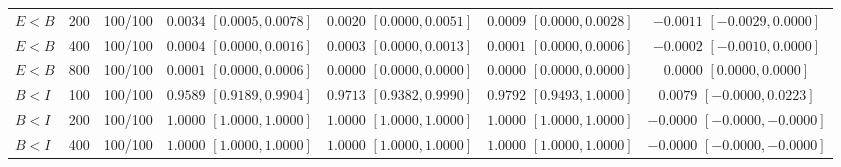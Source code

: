 \documentclass[12pt,letterpaper]{article}
\theoremstyle{plain}
\theoremstyle{definition}
\begin{document}
\begin{table}[p]
\begin{adjustbox}{max width=\linewidth}
\begin{tabular}{lrccccc}
$E<B$ & 200 & 100/100 & \shortstack{$0.0034$\\{\scriptsize$[0.0005,0.0078]$}} & \shortstack{$0.0020$\\{\scriptsize$[0.0000,0.0051]$}} & \shortstack{$0.0009$\\{\scriptsize$[0.0000,0.0028]$}} & \shortstack{$-0.0011$\\{\scriptsize$[-0.0029,0.0000]$}}\\
$E<B$ & 400 & 100/100 & \shortstack{$0.0004$\\{\scriptsize$[0.0000,0.0016]$}} & \shortstack{$0.0003$\\{\scriptsize$[0.0000,0.0013]$}} & \shortstack{$0.0001$\\{\scriptsize$[0.0000,0.0006]$}} & \shortstack{$-0.0002$\\{\scriptsize$[-0.0010,0.0000]$}}\\
$E<B$ & 800 & 100/100 & \shortstack{$0.0001$\\{\scriptsize$[0.0000,0.0006]$}} & \shortstack{$0.0000$\\{\scriptsize$[0.0000,0.0000]$}} & \shortstack{$0.0000$\\{\scriptsize$[0.0000,0.0000]$}} & \shortstack{$0.0000$\\{\scriptsize$[0.0000,0.0000]$}}\\
\addlinespace
$B<I$ & 100 & 100/100 & \shortstack{$0.9589$\\{\scriptsize$[0.9189,0.9904]$}} & \shortstack{$0.9713$\\{\scriptsize$[0.9382,0.9990]$}} & \shortstack{$0.9792$\\{\scriptsize$[0.9493,1.0000]$}} & \shortstack{$0.0079$\\{\scriptsize$[-0.0000,0.0223]$}}\\
$B<I$ & 200 & 100/100 & \shortstack{$1.0000$\\{\scriptsize$[1.0000,1.0000]$}} & \shortstack{$1.0000$\\{\scriptsize$[1.0000,1.0000]$}} & \shortstack{$1.0000$\\{\scriptsize$[1.0000,1.0000]$}} & \shortstack{$-0.0000$\\{\scriptsize$[-0.0000,-0.0000]$}}\\
$B<I$ & 400 & 100/100 & \shortstack{$1.0000$\\{\scriptsize$[1.0000,1.0000]$}} & \shortstack{$1.0000$\\{\scriptsize$[1.0000,1.0000]$}} & \shortstack{$1.0000$\\{\scriptsize$[1.0000,1.0000]$}} & \shortstack{$-0.0000$\\{\scriptsize$[-0.0000,-0.0000]$}}\\

\end{tabular}
\end{adjustbox}
\end{table}
\end{document}

